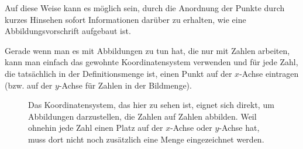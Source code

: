\documentclass[../../main.tex]{subfiles}
\begin{document}
Auf diese Weise kann es möglich sein, durch die Anordnung der Punkte durch kurzes Hinsehen sofort Informationen darüber zu erhalten, wie eine Abbildungsvorschrift aufgebaut ist. 

Gerade wenn man es mit Abbildungen zu tun hat, die nur mit Zahlen arbeiten, kann man einfach das gewohnte Koordinatensystem verwenden und für jede Zahl, die tatsächlich in der Definitionsmenge ist, einen Punkt auf der $x$-Achse eintragen (bzw. auf der $y$-Achse für Zahlen in der Bildmenge).

\begin{figure}[ht]
    \centering
    \caption{Das Koordinatensystem, das hier zu sehen ist, eignet sich direkt, um Abbildungen darzustellen, die Zahlen auf Zahlen abbilden. Weil ohnehin jede Zahl einen Platz auf der $x$-Achse oder $y$-Achse hat, muss dort nicht noch zusätzlich eine Menge eingezeichnet werden.}
\end{figure}
\end{document}
